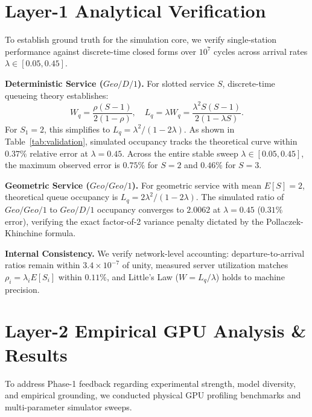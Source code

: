 \documentclass[conference]{IEEEtran}
\begin{document}
\section{Layer-1 Analytical Verification}
To establish ground truth for the simulation core, we verify single-station performance against discrete-time closed forms over $10^7$ cycles across arrival rates $\lambda \in [0.05, 0.45]$.

\textbf{Deterministic Service ($Geo/D/1$).} For slotted service $S$, discrete-time queueing theory establishes:
\begin{equation}
W_q = \frac{\rho(S - 1)}{2(1 - \rho)}, \quad L_q = \lambda W_q = \frac{\lambda^2 S (S - 1)}{2(1 - \lambda S)}.
\end{equation}
For $S_1 = 2$, this simplifies to $L_q = \lambda^2 / (1 - 2\lambda)$. As shown in Table~\ref{tab:validation}, simulated occupancy tracks the theoretical curve within $0.37\%$ relative error at $\lambda = 0.45$. Across the entire stable sweep $\lambda \in [0.05, 0.45]$, the maximum observed error is $0.75\%$ for $S=2$ and $0.46\%$ for $S=3$.

\textbf{Geometric Service ($Geo/Geo/1$).} For geometric service with mean $E[S] = 2$, theoretical queue occupancy is $L_q = 2\lambda^2 / (1 - 2\lambda)$. The simulated ratio of $Geo/Geo/1$ to $Geo/D/1$ occupancy converges to $2.0062$ at $\lambda = 0.45$ ($0.31\%$ error), verifying the exact factor-of-2 variance penalty dictated by the Pollaczek-Khinchine formula.

\textbf{Internal Consistency.} We verify network-level accounting: departure-to-arrival ratios remain within $3.4 \times 10^{-7}$ of unity, measured server utilization matches $\rho_i = \lambda_i E[S_i]$ within $0.11\%$, and Little's Law ($W = L_q / \lambda$) holds to machine precision.

\section{Layer-2 Empirical GPU Analysis \& Results}
To address Phase-1 feedback regarding experimental strength, model diversity, and empirical grounding, we conducted physical GPU profiling benchmarks and multi-parameter simulator sweeps.
\end{document}
